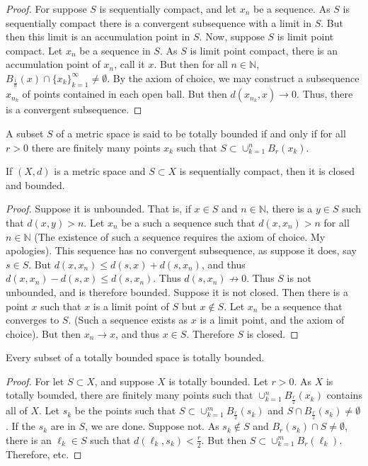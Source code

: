 \documentclass[crop=false,class=book]{standalone}
\begin{document}
\begin{proof}
For suppose $S$ is sequentially compact, and let $x_n$ be a sequence. As $S$ is sequentially compact there is a convergent subsequence with a limit in $S$. But then this limit is an accumulation point in $S$. Now, suppose $S$ is limit point compact. Let $x_n$ be a sequence in $S$. As $S$ is limit point compact, there is an accumulation point of $x_n$, call it $x$. But then for all $n\in \mathbb{N}$, $B_{\frac{1}{n}}(x)\cap \{x_k\}_{k=1}^{\infty}\ne \emptyset$. By the axiom of choice, we may construct a subsequence $x_{n_k}$ of points contained in each open ball. But then $d(x_{n_k},x)\rightarrow 0$. Thus, there is a convergent subsequence.
\end{proof}
\begin{definition}
A subset $S$ of a metric space is said to be totally bounded if and only if for all $r>0$ there are finitely many points $x_k$ such that $S\subset \cup_{k=1}^{n} B_{r}(x_k)$.
\end{definition}
\begin{theorem}
If $(X,d)$ is a metric space and $S\subset X$ is sequentially compact, then it is closed and bounded.
\end{theorem}
\begin{proof}
\item Suppose it is unbounded. That is, if $x\in S$ and $n\in \mathbb{N}$, there is a $y\in S$ such that $d(x,y)>n$. Let $x_n$ be a such a sequence such that $d(x,x_n)>n$ for all $n\in \mathbb{N}$ (The existence of such a sequence requires the axiom of choice. My apologies). This sequence has no convergent subsequence, as suppose it does, say $s\in S$. But $d(x,x_n) \leq d(s,x)+d(s,x_n)$, and thus $d(x,x_n)-d(s,x)\leq d(s,x_n)$. Thus $d(s,x_n) \not\rightarrow 0$. Thus $S$ is not unbounded, and is therefore bounded. Suppose it is not closed. Then there is a point $x$ such that $x$ is a limit point of $S$ but $x\notin S$. Let $x_n$ be a sequence that converges to $S$. (Such a sequence exists as $x$ is a limit point, and the axiom of choice). But then $x_n \rightarrow x$, and thus $x\in S$. Therefore $S$ is closed.
\end{proof}
\begin{theorem}
Every subset of a totally bounded space is totally bounded.
\end{theorem}
\begin{proof}
For let $S\subset X$, and suppose $X$ is totally bounded. Let $r>0$. As $X$ is totally bounded, there are finitely many points such that $\cup_{k=1}^{n} B_{\frac{r}{2}}(x_k)$ contains all of $X$. Let $s_k$ be the points such that $S\subset \cup_{k=1}^{m} B_{\frac{r}{2}}(s_k)$ and $S\cap B_{\frac{r}{2}}(s_k) \ne \emptyset$. If the $s_k$ are in $S$, we are done. Suppose not. As $s_k \notin S$ and $B_{r}(s_k)\cap S \ne \emptyset$, there is an $\ell_k \in S$ such that $d(\ell_k,s_k)< \frac{r}{2}$. But then $S\subset \cup_{k=1}^{m} B_{r}(\ell_k)$. Therefore, etc.
\end{proof}
\end{document}
